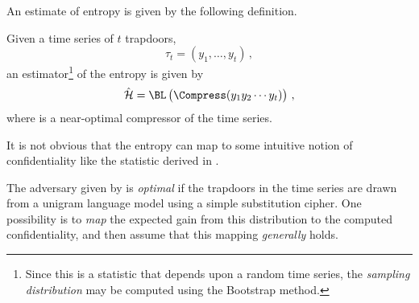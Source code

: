 \documentclass[ ../main.tex]{subfiles}
\begin{document}
An estimate of entropy is given by the following definition.
\begin{definition}
Given a time series of $t$ trapdoors,
\begin{equation}
    \tau_t = \left(y_1,\ldots,y_t\right)\,,
\end{equation}
an estimator\footnote{Since this is a statistic that depends upon a random time series, the \emph{sampling distribution} may be computed using the Bootstrap method.} of the entropy is given by
\begin{equation}
    \hat{\entropy} = \BL\left(\Compress(y_1 y_2 \cdots y_t)\right)\,,
\end{equation}
where \Compress is a near-optimal compressor of the time series.
\end{definition}

It is not obvious that the entropy can map to some intuitive notion of confidentiality like the statistic derived in \Cref{}.

The adversary given by \Cref{} is \emph{optimal} if the trapdoors in the time series are drawn from a unigram language model using a simple substitution cipher. One possibility is to \emph{map} the expected gain from this distribution to the computed confidentiality, and then assume that this mapping \emph{generally} holds.
\end{document}
